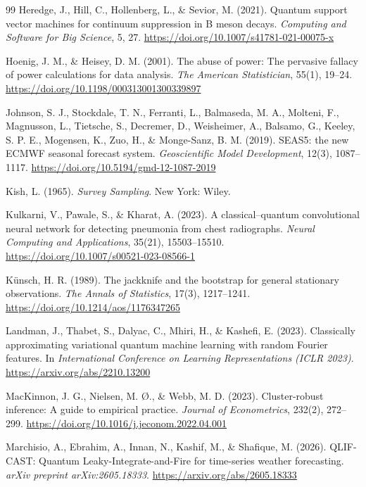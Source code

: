 \documentclass[11pt,a4paper]{article}
\begin{document}
\begin{thebibliography}{99}
Heredge, J., Hill, C., Hollenberg, L., \& Sevior, M. (2021). Quantum support vector machines for continuum suppression in B meson decays. \textit{Computing and Software for Big Science}, 5, 27. \url{https://doi.org/10.1007/s41781-021-00075-x}

Hoenig, J. M., \& Heisey, D. M. (2001). The abuse of power: The pervasive fallacy of power calculations for data analysis. \textit{The American Statistician}, 55(1), 19--24. \url{https://doi.org/10.1198/000313001300339897}

Johnson, S. J., Stockdale, T. N., Ferranti, L., Balmaseda, M. A., Molteni, F., Magnusson, L., Tietsche, S., Decremer, D., Weisheimer, A., Balsamo, G., Keeley, S. P. E., Mogensen, K., Zuo, H., \& Monge-Sanz, B. M. (2019). SEAS5: the new ECMWF seasonal forecast system. \textit{Geoscientific Model Development}, 12(3), 1087--1117. \url{https://doi.org/10.5194/gmd-12-1087-2019}


Kish, L. (1965). \textit{Survey Sampling}. New York: Wiley.

Kulkarni, V., Pawale, S., \& Kharat, A. (2023). A classical--quantum convolutional neural network for detecting pneumonia from chest radiographs. \textit{Neural Computing and Applications}, 35(21), 15503--15510. \url{https://doi.org/10.1007/s00521-023-08566-1}

K\"unsch, H. R. (1989). The jackknife and the bootstrap for general stationary observations. \textit{The Annals of Statistics}, 17(3), 1217--1241. \url{https://doi.org/10.1214/aos/1176347265}

Landman, J., Thabet, S., Dalyac, C., Mhiri, H., \& Kashefi, E. (2023). Classically approximating variational quantum machine learning with random Fourier features. In \textit{International Conference on Learning Representations (ICLR 2023)}. \url{https://arxiv.org/abs/2210.13200}

MacKinnon, J. G., Nielsen, M. \O., \& Webb, M. D. (2023). Cluster-robust inference: A guide to empirical practice. \textit{Journal of Econometrics}, 232(2), 272--299. \url{https://doi.org/10.1016/j.jeconom.2022.04.001}

Marchisio, A., Ebrahim, A., Innan, N., Kashif, M., \& Shafique, M. (2026). QLIF-CAST: Quantum Leaky-Integrate-and-Fire for time-series weather forecasting. \textit{arXiv preprint arXiv:2605.18333}. \url{https://arxiv.org/abs/2605.18333}



\end{thebibliography}
\end{document}

